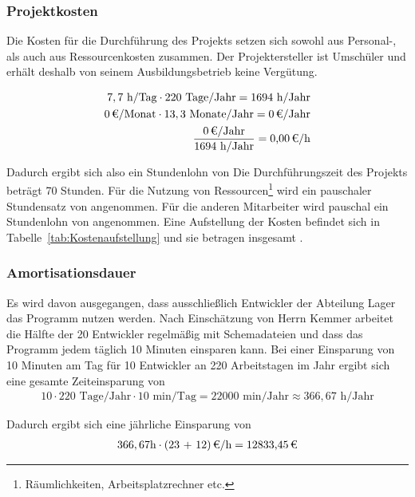 \subsubsection{Projektkosten}
\label{sec:Projektkosten}
Die Kosten für die Durchführung des Projekts setzen sich sowohl aus Personal-, als auch aus Ressourcenkosten zusammen.
Der Projektersteller ist Umschüler und erhält deshalb von seinem Ausbildungsbetrieb keine Vergütung.

\begin{eqnarray}
7,7 \mbox{ h/Tag} \cdot 220 \mbox{ Tage/Jahr} = 1694 \mbox{ h/Jahr}\\
\eur{0}\mbox{/Monat} \cdot 13,3 \mbox{ Monate/Jahr} = \eur{0} \mbox{/Jahr}\\
\frac{\eur{0} \mbox{/Jahr}}{1694 \mbox{ h/Jahr}} = \eur{0,00}\mbox{/h}
\end{eqnarray}

Dadurch ergibt sich also ein Stundenlohn von 
Die Durchführungszeit des Projekts beträgt 70 Stunden. Für die Nutzung von Ressourcen\footnote{Räumlichkeiten, Arbeitsplatzrechner etc.} wird 
ein pauschaler Stundensatz von  angenommen. Für die anderen Mitarbeiter wird pauschal ein Stundenlohn von  angenommen. 
Eine Aufstellung der Kosten befindet sich in Tabelle~\ref{tab:Kostenaufstellung} und sie betragen insgesamt .


\subsubsection{Amortisationsdauer}
\label{sec:Amortisationsdauer}
Es wird davon ausgegangen, dass ausschließlich Entwickler der Abteilung Lager das Programm nutzen werden. Nach Einschätzung von Herrn Kemmer arbeitet die Hälfte der 20 Entwickler regelmäßig mit Schemadateien und dass das Programm jedem täglich 10 Minuten einsparen kann.
Bei einer Einsparung von 10 Minuten am Tag für 10 Entwickler an 220 Arbeitstagen im Jahr ergibt sich eine gesamte Zeiteinsparung von 
\begin{eqnarray}
10 \cdot 220 \mbox{ Tage/Jahr} \cdot 10 \mbox{ min/Tag} = 22000 \mbox{ min/Jahr} \approx 366,67 \mbox{ h/Jahr} 
\end{eqnarray}

Dadurch ergibt sich eine jährliche Einsparung von 
\begin{eqnarray}
366,67 \mbox{h} \cdot \eur{(23 + 12)}{\mbox{/h}} = \eur{12833,45}
\end{eqnarray}

